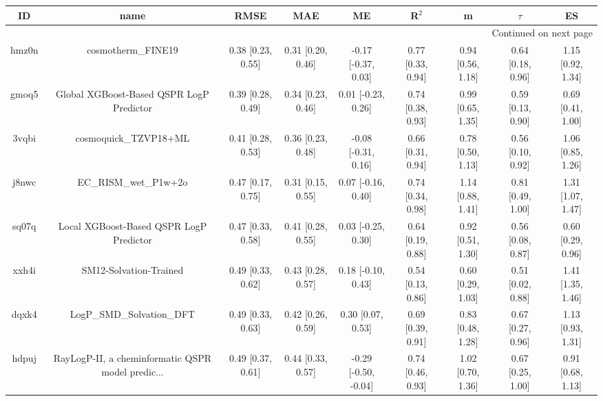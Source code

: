 \documentclass{article}
\begin{document}
\begin{center}
\scriptsize
\begin{longtable}{|ccccccccc|}
\toprule
    ID &                                               name &               RMSE &                MAE &                    ME &              R$^2$ &                    m &               $\tau$ &                    ES \\
\midrule
\endhead
\midrule
\multicolumn{9}{r}{{Continued on next page}} \\
\midrule
\endfoot

\bottomrule
\endlastfoot
 hmz0n &                                 cosmotherm\_FINE19 &  0.38 [0.23, 0.55] &  0.31 [0.20, 0.46] &   -0.17 [-0.37, 0.03] &  0.77 [0.33, 0.94] &    0.94 [0.56, 1.18] &    0.64 [0.18, 0.96] &     1.15 [0.92, 1.34] \\
 gmoq5 &           Global XGBoost-Based QSPR LogP Predictor &  0.39 [0.28, 0.49] &  0.34 [0.23, 0.46] &    0.01 [-0.23, 0.26] &  0.74 [0.38, 0.93] &    0.99 [0.65, 1.35] &    0.59 [0.13, 0.90] &     0.69 [0.41, 1.00] \\
 3vqbi &                              cosmoquick\_TZVP18+ML &  0.41 [0.28, 0.53] &  0.36 [0.23, 0.48] &   -0.08 [-0.31, 0.16] &  0.66 [0.31, 0.94] &    0.78 [0.50, 1.13] &    0.56 [0.10, 0.92] &     1.06 [0.85, 1.26] \\
 j8nwc &                              EC\_RISM\_wet\_P1w+2o &  0.47 [0.17, 0.75] &  0.31 [0.15, 0.55] &    0.07 [-0.16, 0.40] &  0.74 [0.34, 0.98] &    1.14 [0.88, 1.41] &    0.81 [0.49, 1.00] &     1.31 [1.07, 1.47] \\
 sq07q &            Local XGBoost-Based QSPR LogP Predictor &  0.47 [0.33, 0.58] &  0.41 [0.28, 0.55] &    0.03 [-0.25, 0.30] &  0.64 [0.19, 0.88] &    0.92 [0.51, 1.30] &    0.56 [0.08, 0.87] &     0.60 [0.29, 0.96] \\
 xxh4i &                             SM12-Solvation-Trained &  0.49 [0.33, 0.62] &  0.43 [0.28, 0.57] &    0.18 [-0.10, 0.43] &  0.54 [0.13, 0.86] &    0.60 [0.29, 1.03] &    0.51 [0.02, 0.88] &     1.41 [1.35, 1.46] \\
 dqxk4 &                          LogP\_SMD\_Solvation\_DFT &  0.49 [0.33, 0.63] &  0.42 [0.26, 0.59] &     0.30 [0.07, 0.53] &  0.69 [0.39, 0.91] &    0.83 [0.48, 1.28] &    0.67 [0.27, 0.96] &     1.13 [0.93, 1.31] \\
 hdpuj &  RayLogP-II, a cheminformatic QSPR model predic... &  0.49 [0.37, 0.61] &  0.44 [0.33, 0.57] &  -0.29 [-0.50, -0.04] &  0.74 [0.46, 0.93] &    1.02 [0.70, 1.36] &    0.67 [0.25, 1.00] &     0.91 [0.68, 1.13] \\

\end{longtable}
\end{center}
\end{document}
